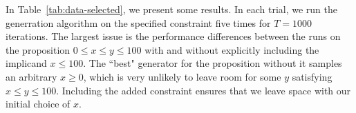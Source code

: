 \documentclass[sigconf,nonacm,review,anonymous]{acmart}
\begin{document}
In Table~\ref{tab:data-selected}, we present some results.
In each trial, we run the generration algorithm on the specified constraint five
times for $T = 1000$ iterations. The largest issue is the performance
differences between the runs on the proposition $0 \leq x \leq y \leq 100$ with
and without explicitly including the implicand $x \leq 100$.
The ``best" generator for the proposition without it samples an
arbitrary $x \geq 0$, which is very unlikely to leave room for some $y$
satisfying $x \leq y \leq 100$. Including the added constraint ensures that we leave space
with our initial choice of $x$.


\begin{table}[h]
\label{tab:data-selected}
\centering
{}
\end{table}

\clearpage


\end{document}
